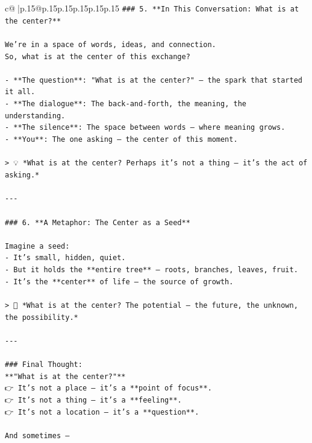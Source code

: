 \documentclass{article}
\begin{document}
{\begin{supertabular}{c@{$\;$}|p{.15\linewidth}@{}p{.15\linewidth}p{.15\linewidth}p{.15\linewidth}p{.15\linewidth}p{.15\linewidth}}
{{{\texttt{\#\#\# 5. **In This Conversation: What is at the center?**} \\
\\ 
\texttt{We’re in a space of words, ideas, and connection.  } \\
\texttt{So, what is at the center of this exchange?} \\
\\ 
\texttt{{-} **The question**: "What is at the center?" — the spark that started it all.} \\
\texttt{{-} **The dialogue**: The back{-}and{-}forth, the meaning, the understanding.} \\
\texttt{{-} **The silence**: The space between words — where meaning grows.} \\
\texttt{{-} **You**: The one asking — the center of this moment.} \\
\\ 
\texttt{> 💡 *What is at the center? Perhaps it’s not a thing — it’s the act of asking.*} \\
\\ 
\texttt{{-}{-}{-}} \\
\\ 
\texttt{\#\#\# 6. **A Metaphor: The Center as a Seed**} \\
\\ 
\texttt{Imagine a seed:} \\
\texttt{{-} It’s small, hidden, quiet.} \\
\texttt{{-} But it holds the **entire tree** — roots, branches, leaves, fruit.} \\
\texttt{{-} It’s the **center** of life — the source of growth.} \\
\\ 
\texttt{> 🌱 *What is at the center? The potential — the future, the unknown, the possibility.*} \\
\\ 
\texttt{{-}{-}{-}} \\
\\ 
\texttt{\#\#\# Final Thought:  } \\
\texttt{**"What is at the center?"**  } \\
\texttt{👉 It’s not a place — it’s a **point of focus**.  } \\
\texttt{👉 It’s not a thing — it’s a **feeling**.  } \\
\texttt{👉 It’s not a location — it’s a **question**.} \\
\\ 
\texttt{And sometimes —  } \\
}}}
\end{supertabular}}
\end{document}
